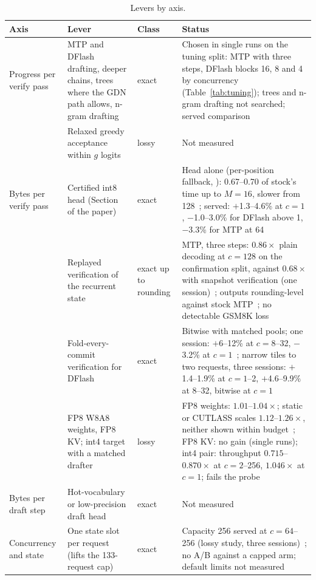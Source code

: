 \begin{table}[htbp]
\tablefont\centering
\caption{Levers by axis.}
\label{tab:axes}
\vskip 0.05in
\begin{tabularx}{\linewidth}{@{}P{2.5cm}YP{1.7cm}P{5.7cm}@{}}\toprule
Axis & Lever & Class & Status\\\midrule
Progress per verify pass & MTP and DFlash drafting, deeper chains, trees where the GDN path allows, n-gram drafting & exact & Chosen in single runs on the tuning split: MTP with three steps, DFlash blocks 16, 8 and 4 by concurrency (Table~\ref{tab:tuning}); trees and n-gram drafting not searched; served comparison~\\
& Relaxed greedy acceptance within $g$ logits & lossy & Not measured\\
Bytes per verify pass & Certified int8 head (Section~ of the paper) & exact & Head alone (per-position fallback, \modelcons{}): 0.67--0.70 of stock's time up to $M=16$, slower from 128~; served: $+$1.3--4.6\% at $c=1$, $-$1.0--3.0\% for DFlash above 1, $-$3.3\% for MTP at 64~\\
& Replayed verification of the recurrent state & exact up to rounding & MTP, three steps: $0.86\times$ plain decoding at $c=128$ on the confirmation split, against $0.68\times$ with snapshot verification (one session)~; outputs rounding-level against stock MTP~; no detectable GSM8K loss~\\
& Fold-every-commit verification for DFlash & exact & Bitwise with matched pools; one session: $+$6--12\% at $c=8$--32, $-$3.2\% at $c=1$~; narrow tiles to two requests, three sessions: $+$1.4--1.9\% at $c=1$--2, $+$4.6--9.9\% at 8--32, bitwise at $c=1$~\\
& FP8 W8A8 weights, FP8 KV; int4 target with a matched drafter~\cite{nota2026} & lossy & FP8 weights: $1.01$--$1.04\times$; static or CUTLASS scales $1.12$--$1.26\times$, neither shown within budget~; FP8 KV: no gain (single runs); int4 pair: throughput $0.715$--$0.870\times$ at $c=2$--256, $1.046\times$ at $c=1$; fails the probe~\\
Bytes per draft step & Hot-vocabulary or low-precision draft head & exact & Not measured\\
Concurrency and state & One state slot per request (lifts the 133-request cap) & exact & Capacity 256 served at $c=64$--256 (lossy study, three sessions)~; no A/B against a capped arm; default limits not measured\\

\end{tabularx}
\end{table}
